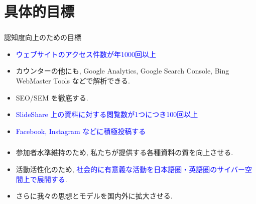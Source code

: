 \documentclass[dvipdfmx,10pt]{beamer}
\newcommand{\bb}{\begin{block}}
\newcommand{\eb}{\end{block}}
\newcommand{\ft}{\frametitle}
\begin{document}
\section{具体的目標}
\begin{frame}\ft{\insertsection}
\bb{認知度向上のための目標}
\begin{itemize}
\item \textcolor{blue}{ウェブサイトのアクセス件数が年1000回以上}
\item カウンターの他にも, Google Analytics, Google Search Console, Bing WebMaster Tools などで解析できる.
\item SEO/SEM を徹底する.
\item \textcolor{blue}{SlideShare 上の資料に対する閲覧数が1つにつき100回以上}
\item \textcolor{blue}{Facebook, Instagram などに積極投稿する}
\end{itemize}
\eb
\end{frame}
\begin{frame}\ft{\insertsection}
\begin{itemize}
\item 参加者水準維持のため, 私たちが提供する各種資料の質を向上させる.
\item 活動活性化のため, \textcolor{blue}{社会的に有意義な活動を日本語圏・英語圏のサイバー空間上で展開する}.
\item さらに我々の思想とモデルを国内外に拡大させる.
\end{itemize}
\end{frame}
\end{document}
